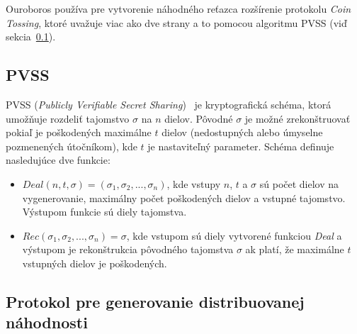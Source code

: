 Ouroboros používa pre vytvorenie náhodného reťazca rozšírenie protokolu \textit{Coin Tossing}, ktoré uvažuje viac ako dve strany a to pomocou algoritmu PVSS (viď sekcia~\ref{subsec:ouroboros-pvss}).

\subsection{PVSS}\label{subsec:ouroboros-pvss}

PVSS (\textit{Publicly Verifiable Secret Sharing})~\cite{pvssFeldman} je kryptografická schéma, ktorá umožňuje rozdeliť tajomstvo $\sigma$ na $n$ dielov. Pôvodné $\sigma$ je možné zrekonštruovať pokiaľ je poškodených maximálne $t$ dielov (nedostupných alebo úmyselne pozmenených útočníkom), kde $t$ je nastaviteľný parameter. Schéma definuje nasledujúce dve funkcie:
\begin{itemize}
	\item $Deal(n, t, \sigma) = (\sigma_1, \sigma_2, ..., \sigma_n)$, kde vstupy $n$, $t$ a $\sigma$ sú počet dielov na vygenerovanie, maximálny počet poškodených dielov a vstupné tajomstvo. Výstupom funkcie sú diely tajomstva.
	\item $Rec(\sigma_1, \sigma_2, ..., \sigma_n) = \sigma$, kde vstupom sú diely vytvorené funkciou \textit{Deal} a výstupom je rekonštrukcia pôvodného tajomstva $\sigma$ ak platí, že maximálne $t$ vstupných dielov je poškodených.
\end{itemize}

\subsection{Protokol pre generovanie distribuovanej náhodnosti}\label{subsec:ouroboros-rnd}
 

